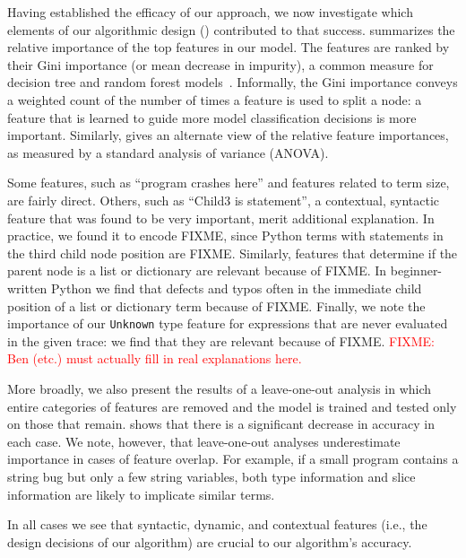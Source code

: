 \documentclass[conference]{IEEEtran}
\newcommand{\fixme}[1]{\textcolor{red}{FIXME: #1}}
\newcommand\lt[1]{{\lstinline|#1|}}
\begin{document}
Having established the efficacy of our approach, we now investigate which
elements of our algorithmic design () contributed to that
success.
 summarizes the relative importance
of the top features in our model. The features are ranked by their
Gini importance (or mean decrease in impurity), a common measure
for decision tree and random forest models~\cite{breiman2001random}. Informally, the
Gini importance conveys a weighted count of the number of times a feature
is used to split a node: a feature that is learned to guide more model
classification decisions is more important. Similarly,  gives
an alternate view of the relative feature importances, as measured by a
standard analysis of variance (ANOVA).

Some features, such as ``program crashes here'' and features
related to term size, are fairly direct. Others, such as ``Child3 is
statement'', a contextual, syntactic feature that was found to be very
important, merit additional explanation. In practice, we found it to
encode FIXME, since Python terms with statements in the third child node
position are FIXME. Similarly, features that determine if the parent node
is a list or dictionary are relevant because of FIXME. In beginner-written
Python we find that defects and typos often in the immediate child position
of a list or dictionary term because of FIXME. Finally, we note the
importance of our \lt{Unknown} type feature for expressions that are never
evaluated in the given trace: we find that they are relevant because of
FIXME. \fixme{Ben (etc.) must actually fill in real explanations here.}

More broadly, we also present the results of a leave-one-out analysis in which
entire categories of features are removed and the model is trained
and tested only on those that remain.  shows
that there is a significant decrease in accuracy in each case. We note,
however, that leave-one-out analyses underestimate importance in cases of
feature overlap. For example, if a small program contains a string bug but
only a few string variables, both type information and slice information
are likely to implicate similar terms.

In all cases we see that syntactic, dynamic, and contextual features (i.e.,
the design decisions of our algorithm) are crucial to our algorithm's
accuracy.

\end{document}
